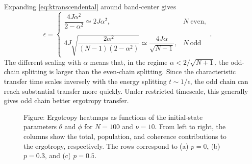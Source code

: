 \documentclass[../../../main.tex]{subfiles}
\begin{document}
Expanding \ref{eq:ktranscendental} around band-center gives
\begin{equation*}
  \epsilon = \begin{cases} \dfrac{4J\alpha^2}{2-\alpha^2}\simeq2J\alpha^2,  & N\; \mathrm{even}, \\\\
              4J\sqrt{\dfrac{2\alpha^2}{(N-1)(2-\alpha^2)}}\simeq \dfrac{4J\alpha }{\sqrt{N-1}}, & N\ \mathrm{odd}
  \end{cases}.
\end{equation*}
The different scaling with $\alpha$ means that, in the regime $\alpha<2/\sqrt{N+1}$, the odd-chain splitting is larger than the even-chain splitting. 
Since the characteristic transfer time scales inversely with the energy splitting $t \sim 1/\epsilon$, the odd chain can reach substantial transfer more quickly. 
Under restricted timescale, this generally gives odd chain better ergotropy transfer.

\begin{figure}
  \centering
  \caption*{Figure: Ergotropy heatmaps as functions of the initial-state parameters $\theta$ and $\phi$ for $N=100$ and $\nu=10$. From left to right, the columns show the total, population, and coherence contributions to the ergotropy, respectively. The rows correspond to (a) $p=0$, (b) $p=0.3$, and (c) $p=0.5$.}
  \label{fig:heatmap}
\end{figure}
\end{document}
